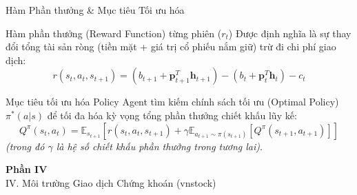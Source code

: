 \documentclass[10pt,aspectratio=169]{beamer}
\begin{document}
\begin{frame}{Hàm Phần thưởng \& Mục tiêu Tối ưu hóa}
  \begin{block}{Hàm phần thưởng (Reward Function) từng phiên ($r_t$)}
    Được định nghĩa là sự thay đổi tổng tài sản ròng (tiền mặt + giá trị cổ phiếu nắm giữ) trừ đi chi phí giao dịch:
    $$r(s_t, a_t, s_{t+1}) = (b_{t+1} + \mathbf{p}_{t+1}^T \mathbf{h}_{t+1}) - (b_t + \mathbf{p}_t^T \mathbf{h}_t) - c_t$$
  \end{block}
  \vspace{0.2cm}
  \begin{exampleblock}{Mục tiêu tối ưu hóa Policy}
    Agent tìm kiếm chính sách tối ưu (Optimal Policy) $\pi^*(a|s)$ để tối đa hóa kỳ vọng tổng phần thưởng chiết khấu lũy kế:
    $$Q^\pi(s_t, a_t) = \mathbb{E}_{s_{t+1}}\left[r(s_t, a_t, s_{t+1}) + \gamma \mathbb{E}_{a_{t+1} \sim \pi(s_{t+1})}\left[Q^\pi(s_{t+1}, a_{t+1})\right]\right]$$
    \textit{(trong đó $\gamma$ là hệ số chiết khấu phần thưởng trong tương lai)}.
  \end{exampleblock}
\end{frame}

\begin{frame}[plain,c]
  \color{white}
  \centering
  \Huge \textbf{Phần IV}\\
  \vspace{0.5cm}
  \Large \color{secondary} IV. Môi trường Giao dịch Chứng khoán (vnstock)
\end{frame}
\end{document}
